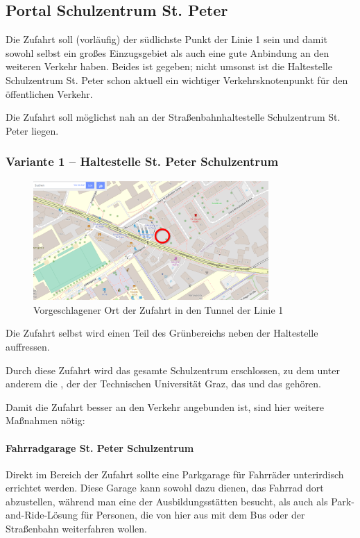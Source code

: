 \subsection{Portal Schulzentrum St. Peter}
Die Zufahrt  soll (vorläufig) der südlichste Punkt der Linie 1 sein und damit sowohl selbst ein großes Einzugsgebiet als auch eine gute Anbindung an den weiteren Verkehr haben. Beides ist gegeben; nicht umsonst ist die Haltestelle Schulzentrum St. Peter schon aktuell ein wichtiger Verkehrsknotenpunkt für den öffentlichen Verkehr.

Die Zufahrt soll möglichst nah an der Straßenbahnhaltestelle Schulzentrum St. Peter liegen.

\subsubsection{Variante 1 -- Haltestelle St. Peter Schulzentrum}

\begin{figure}
    \includegraphics[width=0.8\textwidth]{main/bike/tunnel/uni/zufahrt_inffeld}
    \centering
    \caption[Zufhart St. Peter Schulzentrum]{Vorgeschlagener Ort der Zufahrt in den Tunnel der Linie 1}
\end{figure}


Die Zufahrt selbst wird einen Teil des Grünbereichs neben der Haltestelle auffressen.

Durch diese Zufahrt wird das gesamte Schulzentrum erschlossen, zu dem unter anderem die , der  der Technischen Universität Graz, das  und das  gehören.

Damit die Zufahrt besser an den Verkehr angebunden ist, sind hier weitere Maßnahmen nötig:

\paragraph{Fahrradgarage St. Peter Schulzentrum}
Direkt im Bereich der Zufahrt sollte eine Parkgarage für Fahrräder unterirdisch errichtet werden. Diese Garage kann sowohl dazu dienen, das Fahrrad dort abzustellen, während man eine der Ausbildungsstätten besucht, als auch als Park-and-Ride-Lösung für Personen, die von hier aus mit dem Bus oder der Straßenbahn weiterfahren wollen.

